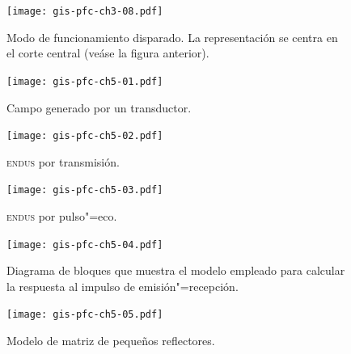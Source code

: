 \documentclass[a4paper,12pt]				{article}
\begin{document}
\begin{figure}
	\begin{center}
		\texttt{[image: gis-pfc-ch3-08.pdf]}
	\end{center}
	\caption[Modo de funcionamiento disparado]{Modo de funcionamiento
	disparado. La representación se centra en el corte central (veáse
	la figura anterior).}
	\label{fig:digtrigosc}
\end{figure}

\clearpage

\begin{figure}
	\begin{center}
		\texttt{[image: gis-pfc-ch5-01.pdf]}
	\end{center}
	\caption[Campo generado por un transductor]{Campo generado por un
	transductor.}
	\label{fig:field}
\end{figure}

\begin{figure}
	\begin{center}
		\texttt{[image: gis-pfc-ch5-02.pdf]}
	\end{center}
	\caption[\textsc{endus} por transmisión]{\textsc{endus} por
	transmisión.}
	\label{fig:transmission}
\end{figure}

\begin{figure}
	\begin{center}
		\texttt{[image: gis-pfc-ch5-03.pdf]}
	\end{center}
	\caption[\textsc{endus} por pulso"=eco]{\textsc{endus} por
	pulso"=eco.}
	\label{fig:echo}
\end{figure}

\begin{figure}
	\begin{center}
		\texttt{[image: gis-pfc-ch5-04.pdf]}
	\end{center}
	\caption[Modelo de emisión"=transmisión]{Diagrama de bloques que
	muestra el modelo empleado para calcular la respuesta al impulso de
	emisión"=recepción.}
	\label{fig:model}
\end{figure}

\clearpage

\begin{figure}
	\begin{center}
		\texttt{[image: gis-pfc-ch5-05.pdf]}
	\end{center}
	\caption[Modelo de matriz de pequeños reflectores]{Modelo de matriz
	de pequeños reflectores.}
	\label{fig:matrix}
\end{figure}
\end{document}
